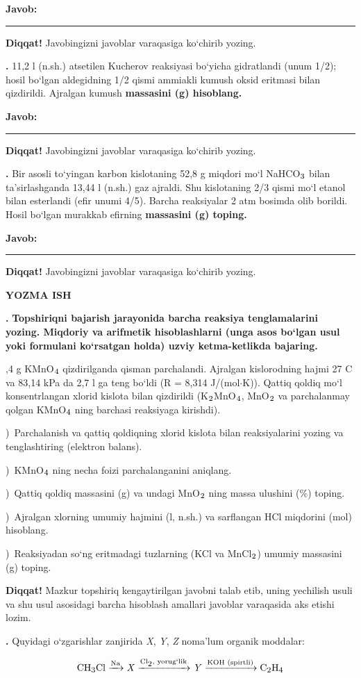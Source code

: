 \documentclass[11pt,a4paper]{article}
\renewcommand{\textsubscript}[1]{\ensuremath{_{\text{\fontsize{8}{8}\selectfont #1}}}}
\newcommand{\qn}[1]{\textbf{\fontsize{11.5}{13}\selectfont #1}}
\newcommand{\qsep}{\par\vspace{13pt}}
\newcommand{\diqqat}[1]{\par\smallskip\noindent\textbf{Diqqat!} #1\par\medskip}
\newcommand{\javob}{\par\nopagebreak[4]\smallskip\noindent\textbf{Javob:} \rule[-2pt]{7.5cm}{0.4pt}\par\smallskip\noindent\textbf{Diqqat!} Javobingizni javoblar varaqasiga ko`chirib yozing.\par\medskip}
\begin{document}
\javob\qsep
\noindent\qn{39.} 11,2 l (n.sh.) atsetilen Kucherov reaksiyasi bo`yicha gidratlandi (unum 1/2); hosil bo`lgan aldegidning 1/2 qismi ammiakli kumush oksid eritmasi bilan qizdirildi. Ajralgan kumush \textbf{massasini (g) hisoblang.}
\javob\qsep
\noindent\qn{40.} Bir asosli to`yingan karbon kislotaning 52,8 g miqdori mo`l NaHCO\textsubscript{3} bilan ta'sirlashganda 13,44 l (n.sh.) gaz ajraldi. Shu kislotaning 2/3 qismi mo`l etanol bilan esterlandi (efir unumi 4/5). Barcha reaksiyalar 2 atm bosimda olib borildi. Hosil bo`lgan murakkab efirning \textbf{massasini (g) toping.}
\javob\qsep
\par\bigskip\begin{center}\textbf{\fontsize{13}{15}\selectfont YOZMA ISH}\end{center}
\noindent\qn{41.} \textbf{Topshiriqni bajarish jarayonida barcha reaksiya tenglamalarini yozing. Miqdoriy va arifmetik hisoblashlarni (unga asos bo`lgan usul yoki formulani ko`rsatgan holda) uzviy ketma-ketlikda bajaring.}\par{},4 g KMnO\textsubscript{4} qizdirilganda qisman parchalandi. Ajralgan kislorodning hajmi 27 \textdegree{}C va 83,14 kPa da 2,7 l ga teng bo`ldi (R = 8,314 J/(mol$\cdot$K)). Qattiq qoldiq mo`l konsentrlangan xlorid kislota bilan qizdirildi (K\textsubscript{2}MnO\textsubscript{4}, MnO\textsubscript{2} va parchalanmay qolgan KMnO\textsubscript{4} ning barchasi reaksiyaga kirishdi).\par
{})\ Parchalanish va qattiq qoldiqning xlorid kislota bilan reaksiyalarini yozing va tenglashtiring (elektron balans).\par
{})\ KMnO\textsubscript{4} ning necha foizi parchalanganini aniqlang.\par
{})\ Qattiq qoldiq massasini (g) va undagi MnO\textsubscript{2} ning massa ulushini (\%) toping.\par
{})\ Ajralgan xlorning umumiy hajmini (l, n.sh.) va sarflangan HCl miqdorini (mol) hisoblang.\par
{})\ Reaksiyadan so`ng eritmadagi tuzlarning (KCl va MnCl\textsubscript{2}) umumiy massasini (g) toping.\par
\diqqat{Mazkur topshiriq kengaytirilgan javobni talab etib, uning yechilish usuli va shu usul asosidagi barcha hisoblash amallari javoblar varaqasida aks etishi lozim.}\qsep
\noindent\qn{42.} Quyidagi o`zgarishlar zanjirida \textit{X}, \textit{Y}, \textit{Z} noma'lum organik moddalar:\par
\[\setlength{\fboxsep}{0pt}\text{CH\textsubscript{3}Cl}\xrightarrow{\text{Na}}\text{\textit{X}}\xrightarrow{\text{Cl\textsubscript{2}, yorug`lik}}\text{\textit{Y}}\xrightarrow{\text{KOH (spirtli)}}\text{C\textsubscript{2}H\textsubscript{4}}\]
\end{document}
